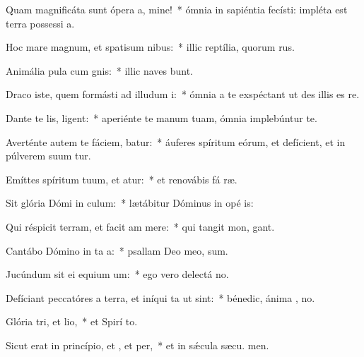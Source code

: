 \item Quam magnificáta sunt ópera a, mine!~* ómnia in sapiéntia fecísti: impléta est terra possessi a.
\item Hoc mare magnum, et spatisum nibus:~* illic reptília, quorum   rus.
\item Animália pula cum gnis:~* illic naves bunt.
\item Draco iste, quem formásti ad illudum i:~* ómnia a te exspéctant ut des illis es  re.
\item Dante te lis, ligent:~* aperiénte te manum tuam, ómnia implebúntur te.
\item Averténte autem te fáciem, batur:~* áuferes spíritum eórum, et defícient, et in púlverem suum tur.
\item Emíttes spíritum tuum, et atur:~* et renovábis fá ræ.
\item Sit glória Dómi in culum:~* lætábitur Dóminus in opé is:
\item Qui réspicit terram, et facit am mere:~* qui tangit mon,  gant.
\item Cantábo Dómino in ta a:~* psallam Deo meo,  sum.
\item Jucúndum sit ei equium um:~* ego vero delectá  no.
\item Defíciant peccatóres a terra, et iníqui ta ut  sint:~* bénedic, ánima , no.
\item Glória tri, et lio,~* et Spirí to.
\item Sicut erat in princípio, et , et per,~* et in sǽcula sæcu. men.
